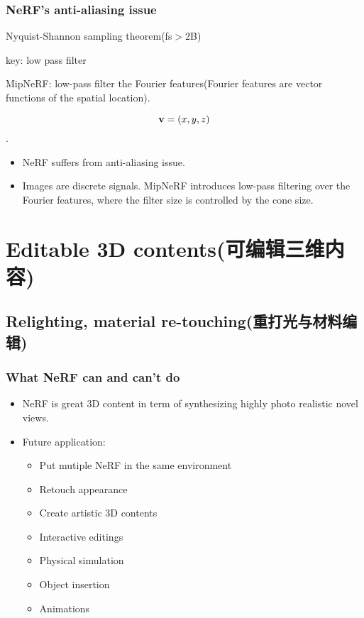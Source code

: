 \documentclass[cn,hazy,blue,14pt,screen]{elegantnote}
\begin{document}
\subsubsection{NeRF's anti-aliasing issue}

Nyquist-Shannon sampling theorem(fs$>$2B)

key: low pass filter

MipNeRF: low-pass filter the Fourier features(Fourier features are vector functions of the spatial location).

\[\bold{v}=(x,y,z)\].

\begin{itemize}
\item NeRF suffers from anti-aliasing issue.
\item Images are discrete signals.
MipNeRF introduces low-pass filtering over the Fourier features, where the filter size is controlled by the cone size.\cite{barron2021mip}
\end{itemize}

\section{Editable 3D contents(可编辑三维内容)}

\subsection{Relighting, material re-touching(重打光与材料编辑)}

\subsubsection{What NeRF can and can't do}

\begin{itemize}
\item NeRF is great 3D content in term of synthesizing highly photo realistic novel views.
\item Future application:
\begin{itemize}
\item Put mutiple NeRF in the same environment
\item Retouch appearance
\item Create artistic 3D contents 
\item Interactive editings
\item Physical simulation
\item Object insertion
\item Animations
\end{itemize}
\end{itemize}
\end{document}
